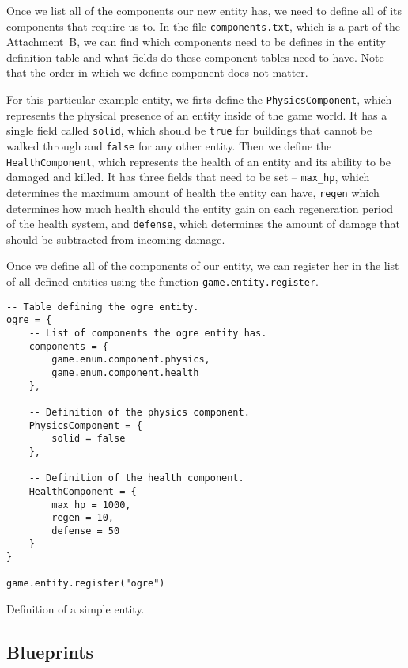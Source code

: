 Once we list all of the components our new entity has, we need to define all of its components that require us to. In the file
\texttt{components.txt}, which is a part of the Attachment~B, we can find which components need to be defines in the entity definition
table and what fields do these component tables need to have. Note that the order in which we define component does not matter.

For this particular example entity, we firts define the \texttt{PhysicsComponent}, which represents the physical presence of an entity
inside of the game world. It has a single field called \texttt{solid}, which should be \texttt{true} for buildings that cannot be
walked through and \texttt{false} for any other entity. Then we define the \texttt{HealthComponent}, which represents the health of an
entity and its ability to be damaged and killed. It has three fields that need to be set -- \texttt{max\_hp}, which determines the
maximum amount of health the entity can have, \texttt{regen} which determines how much health should the entity gain on each regeneration
period of the health system, and \texttt{defense}, which determines the amount of damage that should be subtracted from incoming damage.

Once we define all of the components of our entity, we can register her in the list of all defined entities using the function
\texttt{game.entity.register}.

\begin{listing}
    \centering
    \begin{lstlisting}
-- Table defining the ogre entity.
ogre = {
    -- List of components the ogre entity has.
    components = {
        game.enum.component.physics,
        game.enum.component.health
    },

    -- Definition of the physics component.
    PhysicsComponent = {
        solid = false
    },

    -- Definition of the health component.
    HealthComponent = {
        max_hp = 1000,
        regen = 10,
        defense = 50
    }
}

game.entity.register("ogre")
    \end{lstlisting}
    \caption{Definition of a simple entity.}
    \label{ent-table-ex1}
\end{listing}

\subsection{Blueprints}

